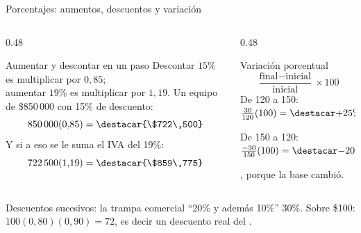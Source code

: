 \documentclass[aspectratio=169,10pt]{beamer}
\begin{document}
\begin{frame}{Porcentajes: aumentos, descuentos y variación}
  \scriptsize
  \begin{columns}[T,onlytextwidth]
    \begin{column}{0.48\textwidth}
      \begin{block}{Aumentar y descontar en un paso}
        \tiny
        Descontar $15\%$ es multiplicar por $0{,}85$; \\
        aumentar $19\%$ es multiplicar por $1{,}19$.
        \vspace{0.06cm}
        Un equipo de \$850\,000 con 15\% de descuento:
        \[ 850\,000 (0{,}85) = \destacar{\$722\,500} \]
        Y si a eso se le suma el IVA del 19\%:
        \[ 722\,500(1{,}19) = \destacar{\$859\,775} \]
      \end{block}
    \end{column}
    \begin{column}{0.48\textwidth}
      \begin{alertblock}{Variación porcentual}
        \tiny
        \[ \frac{\text{final} - \text{inicial}}{\text{inicial}}\times 100 \]
        De 120 a 150: \ $\tfrac{30}{120}(100) = \destacar{+25\%}$

        \vspace{0.06cm}
        De 150 a 120: \ $\tfrac{-30}{150}(100) = \destacar{-20\%}$

        \vspace{0.06cm}
        , porque la base cambió.
      \end{alertblock}
    \end{column}
  \end{columns}

  \vspace{0.08cm}
  \begin{exampleblock}{Descuentos sucesivos: la trampa comercial}
    \tiny
    ``20\% y además 10\%''  30\%. Sobre \$100:
    $100(0{,}80)(0{,}90) = 72$, es decir un descuento real del
    . 
  \end{exampleblock}
\end{frame}
\end{document}
